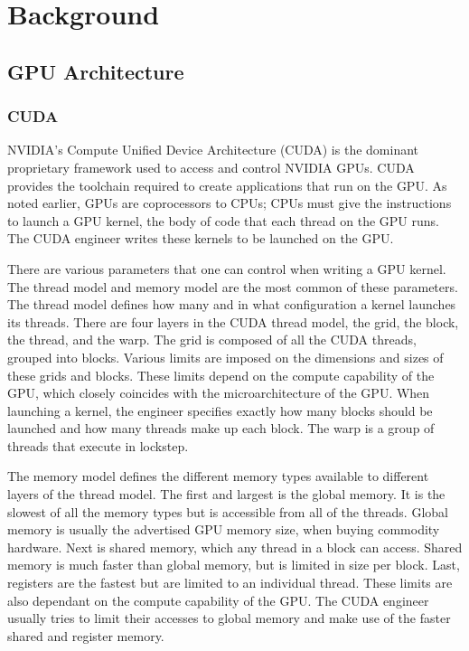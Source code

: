 \chapter{Background}
\label{chap:background}
\section{GPU Architecture}

\subsection{CUDA}

NVIDIA's Compute Unified Device Architecture (CUDA) is the dominant proprietary framework used to access and control NVIDIA GPUs.
CUDA provides the toolchain required to create applications that run on the GPU.
As noted earlier, GPUs are coprocessors to CPUs; CPUs must give the instructions to launch a GPU kernel, the body of code that each thread on the GPU runs.
The CUDA engineer writes these kernels to be launched on the GPU.

There are various parameters that one can control when writing a GPU kernel.
The thread model and memory model are the most common of these parameters.
The thread model defines how many and in what configuration a kernel launches its threads.
There are four layers in the CUDA thread model, the grid, the block, the thread, and the warp.
The grid is composed of all the CUDA threads, grouped into blocks.
Various limits are imposed on the dimensions and sizes of these grids and blocks.
These limits depend on the compute capability of the GPU, which closely coincides with the microarchitecture of the GPU.
When launching a kernel, the engineer specifies exactly how many blocks should be launched and how many threads make up each block.
The warp is a group of threads that execute in lockstep.

The memory model defines the different memory types available to different layers of the thread model.
The first and largest is the global memory.
It is the slowest of all the memory types but is accessible from all of the threads.
Global memory is usually the advertised GPU memory size, when buying commodity hardware.
Next is shared memory, which any thread in a block can access.
Shared memory is much faster than global memory, but is limited in size per block.
Last, registers are the fastest but are limited to an individual thread.
These limits are also dependant on the compute capability of the GPU.
The CUDA engineer usually tries to limit their accesses to global memory and make use of the faster shared and register memory.

